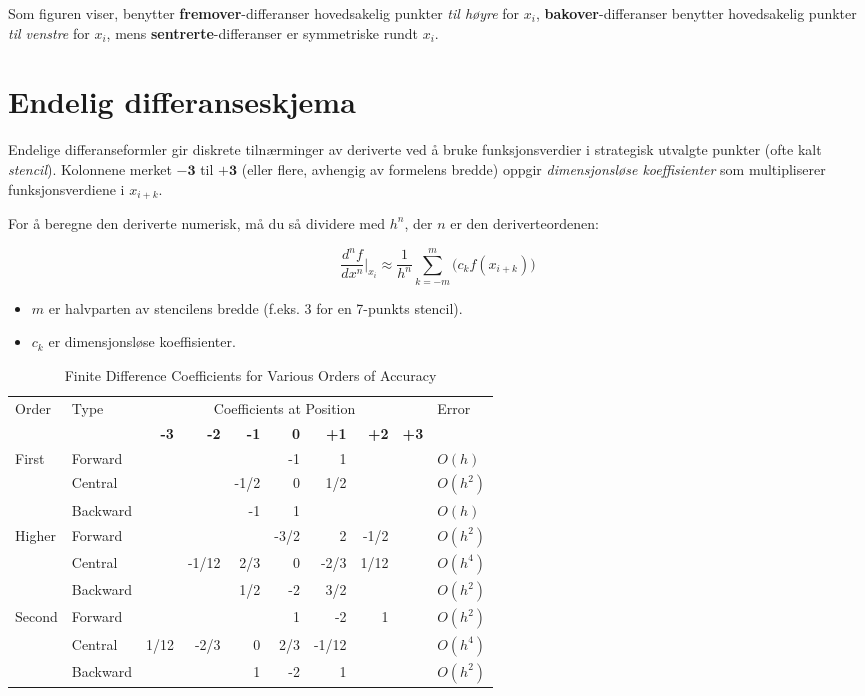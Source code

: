Som figuren viser, benytter \textbf{fremover}-differanser hovedsakelig punkter \emph{til høyre} for \(x_i\),
\textbf{bakover}-differanser benytter hovedsakelig punkter \emph{til venstre} for \(x_i\),
mens \textbf{sentrerte}-differanser er symmetriske rundt \(x_i\).


\section*{Endelig differanseskjema}

Endelige differanseformler gir diskrete tilnærminger av deriverte ved å bruke funksjonsverdier i strategisk utvalgte punkter (ofte kalt \emph{stencil}).
Kolonnene merket \(\mathbf{-3}\) til \(\mathbf{+3}\) (eller flere, avhengig av formelens bredde) oppgir \emph{dimensjonsløse koeffisienter} som multipliserer funksjonsverdiene i \(x_{i + k}\).

For å beregne den deriverte numerisk, må du så dividere med \(h^n\), der \(n\) er den deriverteordenen:

\[
	\frac{d^n f}{dx^n} \Bigg|_{x_i} \approx \frac{1}{h^n} \sum_{k=-m}^{m} \bigl( c_k f(x_{i+k}) \bigr)
\]

\begin{itemize}
	\item \(m\) er halvparten av stencilens bredde (f.eks. 3 for en 7-punkts stencil).
	\item \(c_k\) er dimensjonsløse koeffisienter.
\end{itemize}

\begin{table}[H]
	\centering
	\caption{Finite Difference Coefficients for Various Orders of Accuracy}
	\begin{tabular}{llrrrrrrrl}
		\toprule
		\multirow{2}{*}{Order} & \multirow{2}{*}{Type} & \multicolumn{7}{c}{Coefficients at Position} & \multirow{2}{*}{Error} \\
		\cmidrule{3-9}
		& & \textbf{-3} & \textbf{-2} & \textbf{-1} & \textbf{0} & \textbf{+1} & \textbf{+2} & \textbf{+3} & \\
		\midrule
		\multirow{3}{*}{First} & Forward & & & & -1 & 1 & & & $O(h)$ \\
		& Central & & & -1/2 & 0 & 1/2 & & & $O(h^2)$ \\
		& Backward & & & -1 & 1 & & & & $O(h)$ \\
		\midrule
		\multirow{3}{*}{Higher} & Forward & & & & -3/2 & 2 & -1/2 & & $O(h^2)$ \\
		& Central & & -1/12 & 2/3 & 0 & -2/3 & 1/12 & & $O(h^4)$ \\
		& Backward & & & 1/2 & -2 & 3/2 & & & $O(h^2)$ \\
		\midrule
		\multirow{3}{*}{Second} & Forward & & & & 1 & -2 & 1 & & $O(h^2)$ \\
		& Central & 1/12 & -2/3 & 0 & 2/3 & -1/12 & & & $O(h^4)$ \\
		& Backward & & & 1 & -2 & 1 & & & $O(h^2)$ \\
		\bottomrule
	\end{tabular}
	\label{tab:fd-coefficients}
\end{table}

